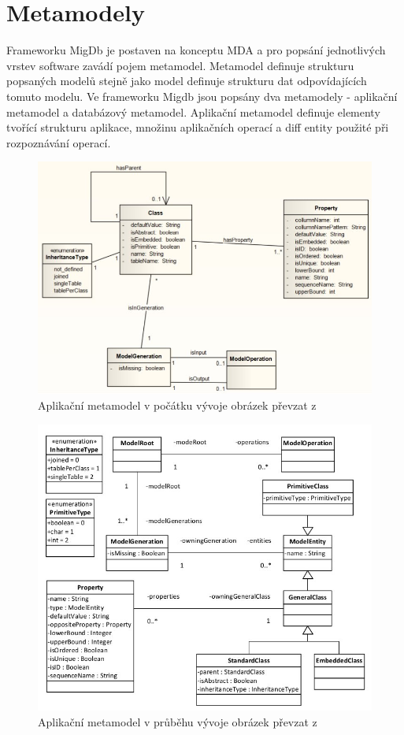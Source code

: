 \documentclass[11pt,twoside,a4paper]{book}
\begin{document}
\section{Metamodely}
Frameworku MigDb je postaven na konceptu MDA \cite{MDA} a pro popsání
jednotlivých vrstev software zavádí pojem metamodel. Metamodel definuje
strukturu popsaných modelů stejně jako model definuje
strukturu dat odpovídajících tomuto modelu.
%
Ve frameworku Migdb jsou popsány dva metamodely - aplikační metamodel a
databázový metamodel. Aplikační metamodel definuje elementy tvořící strukturu
aplikace, množinu aplikačních operací a diff entity použité při rozpoznávání
operací.
%
%
\begin{figure}[h]
\begin{center}
\includegraphics[width=15cm]{figures/app_meta_BP}
\caption{Aplikační metamodel v počátku vývoje obrázek převzat z \cite{Lukes}}
\label{fig:lukes:app_meta}
\end{center}
\end{figure}
%
\begin{figure}[h]
\begin{center}
\includegraphics[width=15cm]{figures/app_meta_BP_jezek}
\caption{Aplikační metamodel v průběhu vývoje obrázek převzat z \cite{Jezek}}
\label{fig:jezek:app_meta}
\end{center}
\end{figure}
\FloatBarrier
%
\end{document}
